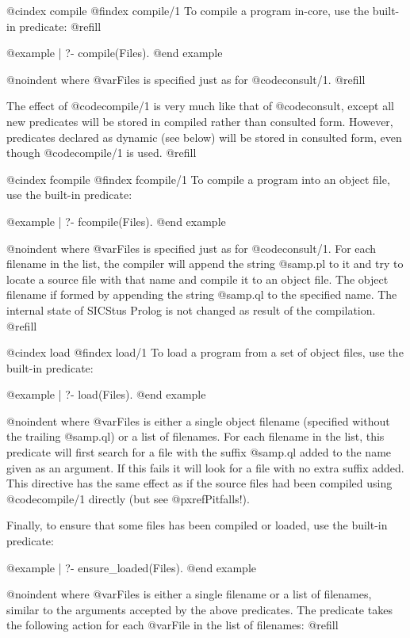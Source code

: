 @cindex compile
@findex compile/1
To compile a program in-core, use the built-in predicate: @refill

@example
| ?- compile(Files).
@end example

@noindent
where @var{Files} is specified just as for @code{consult/1}. @refill

The effect of @code{compile/1} is very much like that of @code{consult},
except all new predicates will be stored in compiled rather than
consulted form.  However, predicates declared as dynamic (see below)
will be stored in consulted form, even though @code{compile/1} is used.
@refill

@cindex fcompile
@findex fcompile/1
To compile a program into an object file, use the built-in predicate:

@example
| ?- fcompile(Files).
@end example

@noindent
where @var{Files} is specified just as for @code{consult/1}.  For each
filename in the list, the compiler will append the string @samp{.pl} to it
and try to locate a source file with that name and compile it to an object
file.  The object filename if formed by appending the string @samp{.ql} to
the specified name.  The internal state of SICStus Prolog is not changed as
result of the compilation. @refill

@cindex load
@findex load/1
To load a program from a set of object files, use the built-in predicate:

@example
| ?- load(Files).
@end example

@noindent
where @var{Files} is either a single object filename (specified without
the trailing @samp{.ql}) or a list of filenames.  For each filename in
the list, this predicate will first search for a file with the suffix
@samp{.ql} added to the name given as an argument.  If this fails it will
look for a file with no extra suffix added.  This directive has the same
effect as if the source files had been compiled using @code{compile/1}
directly (but see @pxref{Pitfalls}!).

Finally, to ensure that some files has been compiled or loaded, use the
built-in predicate:

@example
| ?- ensure_loaded(Files).
@end example

@noindent
where @var{Files} is either a single filename or a list of filenames,
similar to the arguments accepted by the above predicates.  The
predicate takes the following action for each @var{File} in the list of
filenames: @refill

